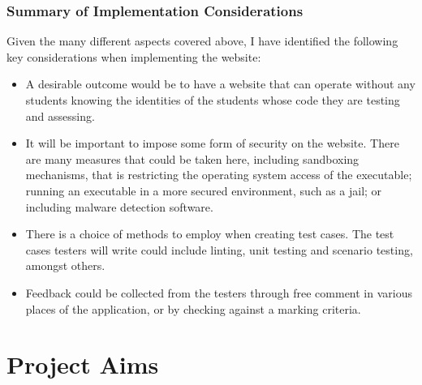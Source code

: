 \documentclass[a4paper,11pt]{report}
\begin{document}
\subsection{Summary of Implementation Considerations}
Given the many different aspects covered above, I have identified the following key considerations when implementing the website:
\begin{itemize}
 \item A desirable outcome would be to have a website that can operate without any students knowing the identities of the students whose code they are testing and assessing.
 \item It will be important to impose some form of security on the website. There are many measures that could be taken here, including sandboxing mechanisms, that is restricting the operating system access of the executable; running an executable in a more secured environment, such as a jail; or including malware detection software.
 \item There is a choice of methods to employ when creating test cases. The test cases testers will write could include linting, unit testing and scenario testing, amongst others.
 \item Feedback could be collected from the testers through free comment in various places of the application, or by checking against a marking criteria.
\end{itemize}






\chapter{Project Aims}
\end{document}
